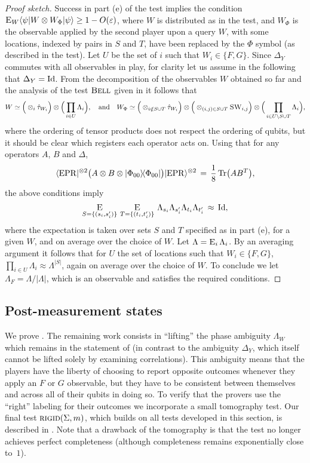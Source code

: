 \documentclass{toc}
\newcommand{\ket}[1]{|#1\rangle}
\newcommand{\bra}[1]{\langle#1|}
\newcommand{\proj}[1]{\ket{#1}\!\bra{#1}}
\newcommand{\Tr}{\mbox{\rm Tr}}
\newcommand{\Id}{\ensuremath{\mathop{\rm Id}\nolimits}}
\newcommand{\Es}[1]{\ensuremath{\mathop{\textsc{E}}}_{#1}} %
\newcommand{\eps}{\varepsilon}
\newcommand{\EPR}{{\rm EPR}}
\newcommand{\bellt}{\textsc{Bell}}
\newcommand{\rigid}{\textsc{rigid}}
\newcommand{\SWAP}{\textsc{SW}}
\newcommand{\phase}{\Lambda}
\begin{document}
\begin{proof}[Proof sketch]
Success in part (e) of the test implies the condition $ \Es{W} \bra{\psi} W
  \otimes W_\Phi \ket{\psi} \geq 1-O(\eps)$, where $W$ is distributed as in the
  test, and $W_{\Phi}$ is the observable applied by the second player upon a
  query $W$, with some locations, indexed by pairs in $S$ and $T$, have been
  replaced by the $\Phi$ symbol (as described in the test). Let $U$ be the set of $i$ such that $W_i\in \{F,G\}$. Since $\Delta_Y$ commutes with all observables in play, for clarity let us assume in the following that $\Delta_Y = \Id$. 
From the decomposition of the observables $W$ obtained so far and the analysis of the test $\bellt$ given in  it follows that 
$$W \simeq \Big(\otimes_i {\hat{\tau}_{W_i}} \Big)\otimes \Big(\prod_{i\in U} \phase_i\Big),\quad\text{and}\quad W_\Phi \simeq  \Big(\otimes_{i\notin S\cup T} {\hat{\tau}_{W_i}}\Big)\otimes\Big( \otimes_{(i,j)\in S\cup T} \SWAP_{i,j} \Big)\otimes \Big(\prod_{i\in U\backslash S\cup T} \phase_i\Big),$$
where the ordering of tensor products does not respect the ordering of qubits, but it should be clear which registers each operator acts on. Using that for any operators $A$, $B$ and $\Delta$, 
$$\bra{\EPR}^{\otimes 2}  \big(A \otimes B \otimes \proj{\Phi_{00}}\big)\ket{\EPR}^{\otimes 2}  \,=\, \frac{1}{8}\,\Tr\big(AB^T\big) ,$$
the above conditions imply 
$$\Es{S=\{(s_i,s'_i)\}}\, \Es{T=\{(t_i,t'_i)\}} \, \phase_{s_i}\phase_{s'_i} \phase_{t_i}\phase_{t'_i} \,\approx\, \Id,$$
where the expectation is taken over sets $S$ and $T$ specified as in part (e), for a given $W$, and on average over the choice of $W$. Let $\phase = \Es{i} \phase_i$. By an averaging argument it follows that for $U$ the set of locations such that $W_i \in \{F,G\}$, $\prod_{i\in U} \phase_i \approx \phase^{|S|}$, again on average over the choice of $W$. To conclude we let $\phase_F = \phase/|\phase|$, which is an observable and satisfies the required conditions. 
\end{proof}


\subsection{Post-measurement states}
\label{sec: RIGID test}

We prove . The remaining work consists in ``lifting'' the phase ambiguity $\phase_W$ which remains in the statement of  (in contrast to the ambiguity $\Delta_Y$, which itself cannot be lifted solely by examining correlations). This ambiguity means that the players have the liberty of choosing to report opposite outcomes whenever they apply an $F$ or $G$ observable, but they have to be consistent between themselves and across all of their qubits in doing so. To verify that the provers use the ``right'' labeling for their outcomes we  incorporate a small tomography test. Our final test  $\rigid(\Sigma,m)$, which builds on all tests developed in this section, is described in . Note that a drawback of the tomography is that the test no longer achieves perfect completeness (although completeness remains exponentially close to~$1$). 
\end{document}
